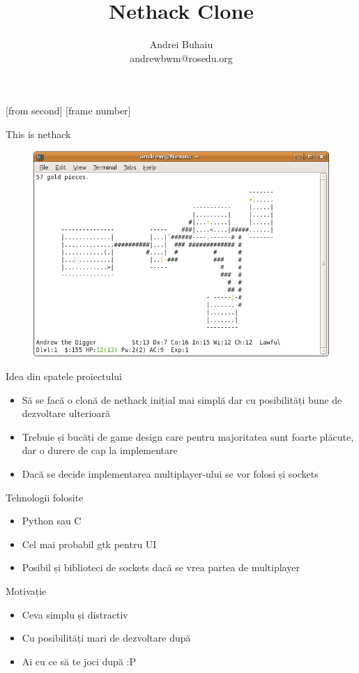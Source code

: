 \documentclass{beamer}
\title[Proiect]{Nethack Clone}
\institute{ROSEdu}
\author{Andrei Buhaiu\\{\footnotesize andrewbwm@rosedu.org}}
\begin{document}
[from second]
[frame number]

\frame{\titlepage}


\begin{frame}{This is nethack}
\begin{figure}[h]
\centering
\includegraphics[scale = 0.3]{poza.png}
\newline
\centering
{}
\end{figure}
\end{frame}

\begin{frame}{Idea din spatele proiectului}
\begin{itemize}
\item Să se facă o clonă de nethack inițial mai simplă dar cu posibilități bune de dezvoltare ulterioară
\newline
\item Trebuie și bucăți de game design care pentru majoritatea sunt foarte plăcute, dar o durere de cap la implementare
\newline
\item Dacă se decide implementarea multiplayer-ului se vor folosi și sockets
\end{itemize}
\end{frame}

\begin{frame}{Tehnologii folosite}
\begin{itemize}
\item Python sau C
\newline
\item Cel mai probabil gtk pentru UI
\newline
\item Posibil și biblioteci de sockets dacă se vrea partea de multiplayer
\end{itemize}
\end{frame}

\begin{frame}{Motivație}
\begin{itemize}
\item Ceva simplu și distractiv
\newline
\item Cu posibilități mari de dezvoltare după
\newline
\item Ai cu ce să te joci după :P
\end{itemize}
\end{frame}
\end{document}
